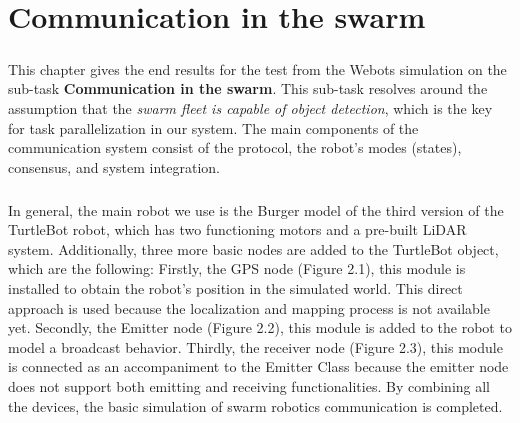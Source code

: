 \chapter{Communication in the swarm}

\paragraph*{}
This chapter gives the end results for the test from the Webots simulation on the sub-task \textbf{Communication in the swarm}. This sub-task resolves around the assumption that the \textit{swarm fleet is capable of object detection}, which is the key for task parallelization in our system. The main components of the communication system consist of the protocol, the robot's modes (states), consensus, and system integration.

\paragraph*{}
In general, the main robot we use is the Burger model of the third version of the TurtleBot robot, which has two functioning motors and a pre-built LiDAR system. Additionally, three more basic nodes are added to the TurtleBot object, which are the following: Firstly, the GPS node (Figure 2.1), this module is installed to obtain the robot’s position in the simulated world. This direct approach is used because the localization and mapping process is not available yet. Secondly, the Emitter node (Figure 2.2), this module is added to the robot to model a broadcast behavior. Thirdly, the receiver node (Figure 2.3), this module is connected as an accompaniment to the Emitter Class because the emitter node does not support both emitting and receiving functionalities. By combining all the devices, the basic simulation of swarm robotics communication is completed.

